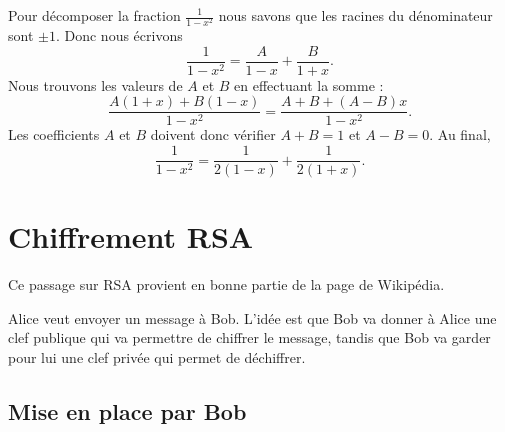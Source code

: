 \begin{example}
	Pour décomposer la fraction \( \frac{1}{ 1-x^2 }\) nous savons que les racines du dénominateur sont \( \pm 1\). Donc nous écrivons
	\begin{equation}
		\frac{1}{ 1-x^2 }=\frac{ A }{ 1-x }+\frac{ B }{ 1+x }.
	\end{equation}
	Nous trouvons les valeurs de \( A\) et \( B\) en effectuant la somme :
	\begin{equation}
		\frac{ A(1+x)+B(1-x) }{ 1-x^2 }=\frac{ A+B+(A-B)x }{ 1-x^2 }.
	\end{equation}
	Les coefficients \( A\) et \( B\) doivent donc vérifier \( A+B=1\) et \( A-B=0\). Au final,
	\begin{equation}
		\frac{1}{ 1-x^2 }=\frac{1}{ 2(1-x) }+\frac{1}{ 2(1+x) }.
	\end{equation}
\end{example}

\section{Chiffrement RSA}
\label{SecEVaFYi}

Ce passage sur RSA provient en bonne partie de la page de Wikipédia\cite{ooRIFDooNxOehF}.

Alice veut envoyer un message à Bob. L'idée est que Bob va donner à Alice une clef publique qui va permettre de chiffrer le message, tandis que Bob va garder pour lui une clef privée qui permet de déchiffrer.

\subsection{Mise en place par Bob}

